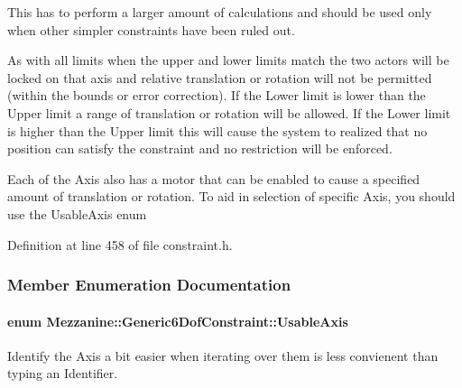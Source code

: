 This has to perform a larger amount of calculations and should be used only when other simpler constraints have been ruled out. \par
 \par
 As with all limits when the upper and lower limits match the two actors will be locked on that axis and relative translation or rotation will not be permitted (within the bounds or error correction). If the Lower limit is lower than the Upper limit a range of translation or rotation will be allowed. If the Lower limit is higher than the Upper limit this will cause the system to realized that no position can satisfy the constraint and no restriction will be enforced. \par
 \par
 Each of the Axis also has a motor that can be enabled to cause a specified amount of translation or rotation. To aid in selection of specific Axis, you should use the UsableAxis enum 

Definition at line 458 of file constraint.h.



\subsubsection{Member Enumeration Documentation}
\hypertarget{classMezzanine_1_1Generic6DofConstraint_ac00067026a7d4e7c6832f169c754d585}{
\paragraph[{UsableAxis}]{\setlength{\rightskip}{0pt plus 5cm}enum {\bf Mezzanine::Generic6DofConstraint::UsableAxis}}\hfill}
\label{classMezzanine_1_1Generic6DofConstraint_ac00067026a7d4e7c6832f169c754d585}


Identify the Axis a bit easier when iterating over them is less convienent than typing an Identifier. 

